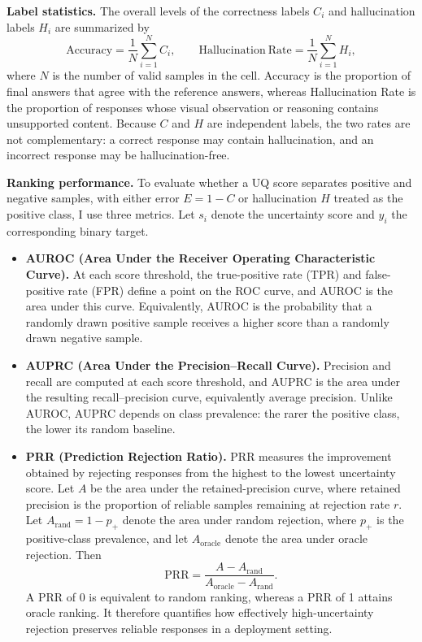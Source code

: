 \textbf{Label statistics.} The overall levels of the correctness labels $C_i$ and hallucination labels $H_i$ are summarized by
\[
\mathrm{Accuracy}=\frac{1}{N}\sum_{i=1}^{N}C_i,
\qquad
\mathrm{Hallucination\ Rate}=\frac{1}{N}\sum_{i=1}^{N}H_i,
\]
where $N$ is the number of valid samples in the cell. Accuracy is the proportion of final answers that agree with the reference answers, whereas Hallucination Rate is the proportion of responses whose visual observation or reasoning contains unsupported content. Because $C$ and $H$ are independent labels, the two rates are not complementary: a correct response may contain hallucination, and an incorrect response may be hallucination-free.

\textbf{Ranking performance.} To evaluate whether a UQ score separates positive and negative samples, with either error $E=1-C$ or hallucination $H$ treated as the positive class, I use three metrics. Let $s_i$ denote the uncertainty score and $y_i$ the corresponding binary target.

\begin{itemize}[leftmargin=2em]
    \item \textbf{AUROC (Area Under the Receiver Operating Characteristic Curve).} At each score threshold, the true-positive rate (TPR) and false-positive rate (FPR) define a point on the ROC curve, and AUROC is the area under this curve. Equivalently, AUROC is the probability that a randomly drawn positive sample receives a higher score than a randomly drawn negative sample.

    \item \textbf{AUPRC (Area Under the Precision--Recall Curve).} Precision and recall are computed at each score threshold, and AUPRC is the area under the resulting recall--precision curve, equivalently average precision. Unlike AUROC, AUPRC depends on class prevalence: the rarer the positive class, the lower its random baseline.

    \item \textbf{PRR (Prediction Rejection Ratio).} PRR measures the improvement obtained by rejecting responses from the highest to the lowest uncertainty score. Let $A$ be the area under the retained-precision curve, where retained precision is the proportion of reliable samples remaining at rejection rate $r$. Let $A_{\mathrm{rand}}=1-p_+$ denote the area under random rejection, where $p_+$ is the positive-class prevalence, and let $A_{\mathrm{oracle}}$ denote the area under oracle rejection. Then
    \[
    \mathrm{PRR}=\frac{A-A_{\mathrm{rand}}}{A_{\mathrm{oracle}}-A_{\mathrm{rand}}}.
    \]
    A PRR of 0 is equivalent to random ranking, whereas a PRR of 1 attains oracle ranking. It therefore quantifies how effectively high-uncertainty rejection preserves reliable responses in a deployment setting.
\end{itemize}

